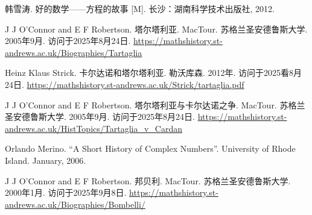 韩雪涛. 好的数学——方程的故事 [M]. 长沙：湖南科学技术出版社, 2012. %

J J O'Connor and E F Robertson. 塔尔塔利亚. MacTour. 苏格兰圣安德鲁斯大学. 2005年9月. 访问于2025年8月24日. \url{https://mathshistory.st-andrews.ac.uk/Biographies/Tartaglia}

Heinz Klaus Strick. 卡尔达诺和塔尔塔利亚. 勒沃库森. 2012年. 访问于2025看8月24日. \url{https://mathshistory.st-andrews.ac.uk/Strick/tartaglia.pdf}

J J O'Connor and E F Robertson. 塔尔塔利亚与卡尔达诺之争. MacTour. 苏格兰圣安德鲁斯大学. 2005年9月. 访问于2025年8月24日. \url{https://mathshistory.st-andrews.ac.uk/HistTopics/Tartaglia_v_Cardan} %

Orlando Merino. ``A Short History of Complex Numbers''. University of Rhode Island. January, 2006.

J J O'Connor and E F Robertson. 邦贝利. MacTour. 苏格兰圣安德鲁斯大学. 2000年1月. 访问于2025年9月8日. \url{https://mathshistory.st-andrews.ac.uk/Biographies/Bombelli/}
